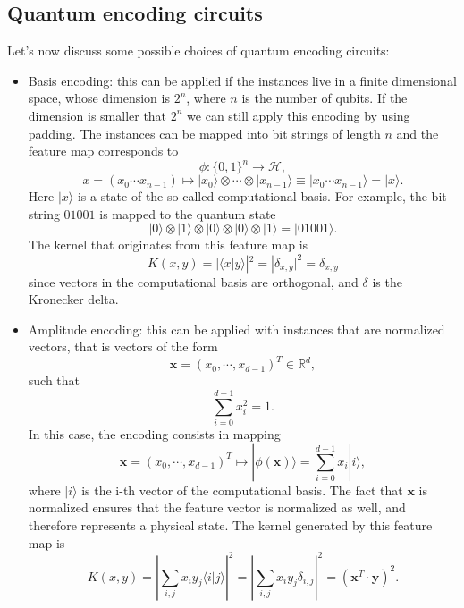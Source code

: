 \documentclass[12pt]{article}
\begin{document}
\subsection{Quantum encoding circuits}
Let's now discuss some possible choices of quantum encoding circuits:
\begin{itemize}
    \item Basis encoding: this can be applied if the instances live in a finite dimensional space, whose dimension is $2^n$, where $n$ is the number of qubits. If the dimension is smaller that $2^n$ we can still apply this encoding by using padding. The instances can be mapped into bit strings of length $n$ and the feature map corresponds to
    \begin{equation}
        \phi:\{0,1\}^n \rightarrow \mathcal{H},
    \end{equation}
    $$x=(x_0\cdots x_{n-1})\mapsto |x_0\rangle \otimes \cdots \otimes |x_{n-1}\rangle\equiv|x_0\cdots x_{n-1}\rangle=|x\rangle.$$ Here $|x\rangle$ is a state of the so called computational basis. For example, the bit string $01001$ is mapped to the quantum state $$|0\rangle \otimes |1\rangle \otimes |0\rangle \otimes |0\rangle \otimes |1\rangle=|01001\rangle.$$ The kernel that originates from this feature map is 
    \begin{equation}
        K(x,y)=|\langle x|y\rangle|^2=|\delta_{x,y}|^2=\delta_{x,y}
    \end{equation}
    since vectors in the computational basis are orthogonal, and $\delta$ is the Kronecker delta. 
    \item Amplitude encoding: this can be applied with instances that are normalized vectors, that is vectors of the form 
    \begin{equation}
        \mathbf{x}=(x_0, \cdots, x_{d-1})^T\in \mathbb{R}^d,
    \end{equation}
    such that $$\sum_{i=0}^{d-1}x_i^2=1.$$
    In this case, the encoding consists in mapping
    \begin{equation}
        \mathbf{x}=(x_0, \cdots, x_{d-1})^T \mapsto |\phi(\mathbf{x})\rangle=\sum_{i=0}^{d-1}x_i|i\rangle,
    \end{equation}
    where $|i\rangle$ is the i-th vector of the computational basis. The fact that $\mathbf{x}$ is normalized ensures that the feature vector is normalized as well, and therefore represents a physical state. The kernel generated by this feature map is 
    \begin{equation}
        K(x,y)=\left|\sum_{i,j}x_iy_j\langle i|j\rangle\right|^2=\left|\sum_{i,j}x_iy_j\delta_{i,j}\right|^2=(\mathbf{x}^T \cdot \mathbf{y})^2.

\end{equation}
\end{itemize}
\end{document}
